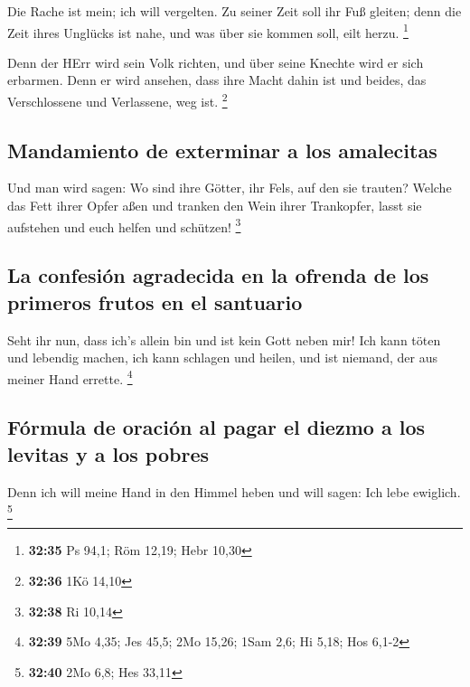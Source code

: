 Die Rache ist mein; ich will vergelten. Zu seiner Zeit
soll ihr Fuß gleiten; denn die Zeit ihres Unglücks ist nahe, und was
über sie kommen soll, eilt herzu. \footnote{\textbf{32:35} Ps 94,1; Röm
  12,19; Hebr 10,30}

 Denn der HErr wird sein Volk richten, und über seine
Knechte wird er sich erbarmen. Denn er wird ansehen, dass ihre Macht
dahin ist und beides, das Verschlossene und Verlassene, weg ist.
\footnote{\textbf{32:36} 1Kö 14,10}

\hypertarget{mandamiento-de-exterminar-a-los-amalecitas}{%
\subsection{Mandamiento de exterminar a los
amalecitas}\label{mandamiento-de-exterminar-a-los-amalecitas}}

 Und man wird sagen: Wo sind ihre Götter, ihr Fels, auf
den sie trauten?  Welche das Fett ihrer Opfer aßen und
tranken den Wein ihrer Trankopfer, lasst sie aufstehen und euch helfen
und schützen! \footnote{\textbf{32:38} Ri 10,14}

\hypertarget{la-confesiuxf3n-agradecida-en-la-ofrenda-de-los-primeros-frutos-en-el-santuario}{%
\subsection{La confesión agradecida en la ofrenda de los primeros frutos
en el
santuario}\label{la-confesiuxf3n-agradecida-en-la-ofrenda-de-los-primeros-frutos-en-el-santuario}}

 Seht ihr nun, dass ich's allein bin und ist kein Gott
neben mir! Ich kann töten und lebendig machen, ich kann schlagen und
heilen, und ist niemand, der aus meiner Hand errette. \footnote{\textbf{32:39}
  5Mo 4,35; Jes 45,5; 2Mo 15,26; 1Sam 2,6; Hi 5,18; Hos 6,1-2}

\hypertarget{fuxf3rmula-de-oraciuxf3n-al-pagar-el-diezmo-a-los-levitas-y-a-los-pobres}{%
\subsection{Fórmula de oración al pagar el diezmo a los levitas y a los
pobres}\label{fuxf3rmula-de-oraciuxf3n-al-pagar-el-diezmo-a-los-levitas-y-a-los-pobres}}

 Denn ich will meine Hand in den Himmel heben und will
sagen: Ich lebe ewiglich. \footnote{\textbf{32:40} 2Mo 6,8; Hes 33,11}

